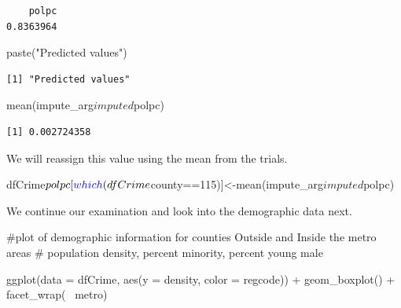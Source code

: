 \documentclass[]{article}
\newenvironment{Shaded}{}{}
\newcommand{\CommentTok}[1]{\textcolor[rgb]{0.00,0.50,0.00}{#1}}
\newcommand{\DataTypeTok}[1]{#1}
\newcommand{\DecValTok}[1]{#1}
\newcommand{\KeywordTok}[1]{\textcolor[rgb]{0.00,0.00,1.00}{#1}}
\newcommand{\NormalTok}[1]{#1}
\newcommand{\OperatorTok}[1]{#1}
\newcommand{\StringTok}[1]{\textcolor[rgb]{0.00,0.50,0.50}{#1}}
\begin{document}
\begin{verbatim}
    polpc 
0.8363964 
\end{verbatim}

\begin{Shaded}
\begin{Highlighting}[]
\KeywordTok{paste}\NormalTok{(}\StringTok{"Predicted values"}\NormalTok{)}
\end{Highlighting}
\end{Shaded}

\begin{verbatim}
[1] "Predicted values"
\end{verbatim}

\begin{Shaded}
\begin{Highlighting}[]
\KeywordTok{mean}\NormalTok{(impute_arg}\OperatorTok{$}\NormalTok{imputed}\OperatorTok{$}\NormalTok{polpc)}
\end{Highlighting}
\end{Shaded}

\begin{verbatim}
[1] 0.002724358
\end{verbatim}

We will reassign this value using the mean from the trials.

\begin{Shaded}
\begin{Highlighting}[]
\NormalTok{dfCrime}\OperatorTok{$}\NormalTok{polpc[}\KeywordTok{which}\NormalTok{(dfCrime}\OperatorTok{$}\NormalTok{county}\OperatorTok{==}\DecValTok{115}\NormalTok{)]<-}\KeywordTok{mean}\NormalTok{(impute_arg}\OperatorTok{$}\NormalTok{imputed}\OperatorTok{$}\NormalTok{polpc)}
\end{Highlighting}
\end{Shaded}

We continue our examination and look into the demographic data next.

\begin{Shaded}
\begin{Highlighting}[]
\CommentTok{#plot of demographic information for counties Outside and Inside the metro areas}
\CommentTok{# population density, percent minority, percent young male}

\KeywordTok{ggplot}\NormalTok{(}\DataTypeTok{data =}\NormalTok{ dfCrime, }\KeywordTok{aes}\NormalTok{(}\DataTypeTok{y =}\NormalTok{ density, }\DataTypeTok{color =}\NormalTok{ regcode)) }\OperatorTok{+}
\StringTok{      }\KeywordTok{geom_boxplot}\NormalTok{() }\OperatorTok{+}\StringTok{ }\KeywordTok{facet_wrap}\NormalTok{(}\OperatorTok{~}\StringTok{ }\NormalTok{metro)}
\end{Highlighting}
\end{Shaded}
\end{document}
